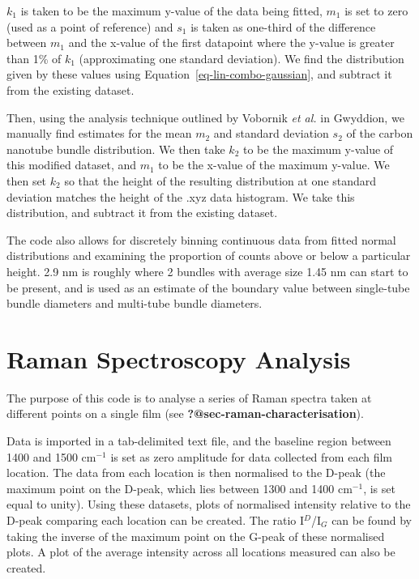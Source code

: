 \documentclass[
  a4paper,
]{scrbook}
\begin{document}
\(k_1\) is taken to be the maximum y-value of the data being fitted,
\(m_1\) is set to zero (used as a point of reference) and \(s_1\) is
taken as one-third of the difference between \(m_1\) and the x-value of
the first datapoint where the y-value is greater than 1\% of \(k_1\)
(approximating one standard deviation). We find the distribution given
by these values using Equation~\ref{eq-lin-combo-gaussian}, and subtract
it from the existing dataset.

Then, using the analysis technique outlined by Vobornik \emph{et al.}
\autocite{Vobornik2023} in Gwyddion, we manually find estimates for the
mean \(m_2\) and standard deviation \(s_2\) of the carbon nanotube
bundle distribution. We then take \(k_2\) to be the maximum y-value of
this modified dataset, and \(m_1\) to be the x-value of the maximum
y-value. We then set \(k_2\) so that the height of the resulting
distribution at one standard deviation matches the height of the .xyz
data histogram. We take this distribution, and subtract it from the
existing dataset.

The code also allows for discretely binning continuous data from fitted
normal distributions and examining the proportion of counts above or
below a particular height. 2.9 nm is roughly where 2 bundles with
average size 1.45 nm can start to be present, and is used as an estimate
of the boundary value between single-tube bundle diameters and
multi-tube bundle diameters.

\hypertarget{sec-raman-analysis}{%
\section{Raman Spectroscopy Analysis}\label{sec-raman-analysis}}

The purpose of this code is to analyse a series of Raman spectra taken
at different points on a single film (see
\textbf{?@sec-raman-characterisation}).

Data is imported in a tab-delimited text file, and the baseline region
between 1400 and 1500 cm\(^{-1}\) is set as zero amplitude for data
collected from each film location. The data from each location is then
normalised to the D-peak (the maximum point on the D-peak, which lies
between 1300 and 1400 cm\(^{-1}\), is set equal to unity). Using these
datasets, plots of normalised intensity relative to the D-peak comparing
each location can be created. The ratio I\(^{D}\)/I\(_{G}\) can be found
by taking the inverse of the maximum point on the G-peak of these
normalised plots. A plot of the average intensity across all locations
measured can also be created.
\end{document}
